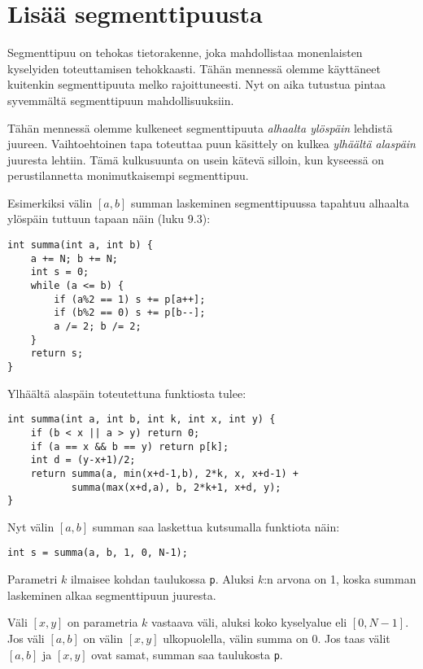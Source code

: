 \chapter{Lisää segmenttipuusta}


Segmenttipuu on tehokas tietorakenne,
joka mahdollistaa monenlaisten
kyselyiden toteuttamisen tehokkaasti.
Tähän mennessä olemme käyttäneet
kuitenkin segmenttipuuta melko rajoittuneesti.
Nyt on aika tutustua pintaa syvemmältä
segmenttipuun mahdollisuuksiin.

Tähän mennessä olemme kulkeneet segmenttipuuta
\textit{alhaalta ylöspäin} lehdistä juureen.
Vaihtoehtoinen tapa toteuttaa puun käsittely
on kulkea \textit{ylhäältä alaspäin} juuresta lehtiin.
Tämä kulkusuunta on usein kätevä silloin,
kun kyseessä on perustilannetta
monimutkaisempi segmenttipuu.

Esimerkiksi välin $[a,b]$ summan laskeminen
segmenttipuussa tapahtuu alhaalta ylöspäin 
tuttuun tapaan näin (luku 9.3):

\begin{lstlisting}
int summa(int a, int b) {
    a += N; b += N;
    int s = 0;
    while (a <= b) {
        if (a%2 == 1) s += p[a++];
        if (b%2 == 0) s += p[b--];
        a /= 2; b /= 2;
    }
    return s;
}
\end{lstlisting}
Ylhäältä alaspäin toteutettuna funktiosta tulee:

\begin{lstlisting}
int summa(int a, int b, int k, int x, int y) {
    if (b < x || a > y) return 0;
    if (a == x && b == y) return p[k];
    int d = (y-x+1)/2;
    return summa(a, min(x+d-1,b), 2*k, x, x+d-1) +
           summa(max(x+d,a), b, 2*k+1, x+d, y);
}
\end{lstlisting}
Nyt välin $[a,b]$ summan saa laskettua
kutsumalla funktiota näin:

\begin{lstlisting}
int s = summa(a, b, 1, 0, N-1);
\end{lstlisting}

Parametri $k$ ilmaisee kohdan
taulukossa \texttt{p}.
Aluksi $k$:n arvona on 1,
koska summan laskeminen alkaa
segmenttipuun juuresta.

Väli $[x,y]$ on parametria $k$ vastaava väli,
aluksi koko kyselyalue eli $[0,N-1]$.
Jos väli $[a,b]$ on välin $[x,y]$
ulkopuolella, välin summa on 0.
Jos taas välit $[a,b]$ ja $[x,y]$
ovat samat, summan saa taulukosta \texttt{p}.

